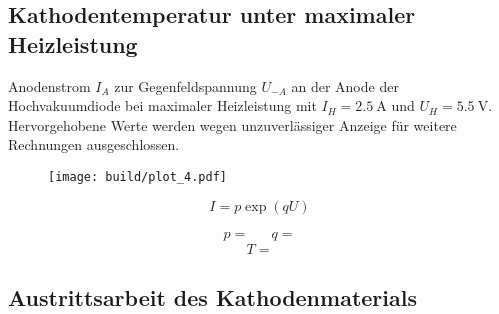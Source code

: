 \subsection{Kathodentemperatur unter maximaler Heizleistung}

\begin{table}[H]
	\caption{Anodenstrom $I_A$ zur Gegenfeldspannung $U_{-A}$ an der Anode der Hochvakuumdiode bei maximaler Heizleistung mit
			 $I_H = \qty{2.5}{\ampere}$ und $U_H = \qty{5.5}{\volt}$. Hervorgehobene Werte werden wegen unzuverlässiger Anzeige
			 für weitere Rechnungen ausgeschlossen.}
	\centering
	
	\label{tab:table_2}
\end{table}

\begin{figure}[H]
	\texttt{[image: build/plot\_4.pdf]}
	\caption{}
	\label{fig:plot_4}
\end{figure}

\begin{equation*}
	I = p \exp(qU)
\end{equation*}

\begin{align*}
	p =  && q = 
\end{align*}
\begin{equation*}
	T = 
\end{equation*}

\subsection{Austrittsarbeit des Kathodenmaterials}

